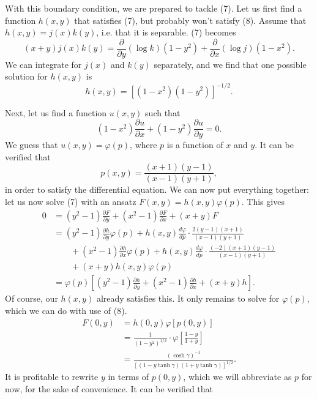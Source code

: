 \documentclass[12pt]{article}
\begin{document}
With this boundary condition, we are prepared to tackle (7).  Let us first find a function $h(x,y)$ that satisfies (7), but probably won't satisfy (8).  Assume that $h(x,y)=j(x)k(y)$, i.e. that it is separable.  (7) becomes
\[
	(x+y) j(x) k(y) = \frac{\partial }{\partial y}(\log k)(1-y^{2}) + \frac{\partial }{\partial x}(\log j)(1-x^2).
\] 
We can integrate for $j(x)$ and $k(y)$ separately, and we find that one possible solution for $h(x,y)$ is
\begin{equation}
	h(x,y) = \left[ (1-x^2) (1-y^2) \right] ^{-1/2}.
\end{equation}

Next, let us find a function $u(x,y)$ such that
\[
	(1-x^2)\frac{\partial u}{\partial x} + (1-y^2)\frac{\partial u}{\partial y} = 0.
\] 
We guess that $u(x,y) = \varphi(p)$, where $p$ is a function of $x$ and $y$.  It can be verified that 
\begin{equation}
	p (x,y) = \frac{(x+1)(y-1)}{(x-1)(y+1)},
\end{equation}
in order to satisfy the differential equation.  We can now put everything together: let us now solve (7) with an ansatz $F(x,y) = h(x,y) \varphi(p)$.  This gives
\begin{align*}
	0 &= (y^2 - 1)\frac{\partial F}{\partial y} + (x^2 - 1)\frac{\partial F}{\partial x} + (x+ y) F \\
	  &= (y^2 - 1)\frac{\partial h}{\partial y}\varphi(p) + h(x,y) \frac{\textit{d}\varphi}{\textit{d}p} \cdot \frac{2(y-1)(x+1)}{(x-1)(y+1)} \\
	  &   \qquad  + (x^2 - 1)\frac{\partial h}{\partial x}\varphi(p) + h(x,y) \frac{\textit{d}\varphi}{\textit{d}p} \cdot \frac{(-2)(x+1)(y-1)}{(x-1)(y+1)} \\
	  & \qquad + (x+y)h(x,y)\varphi(p)  \\
	  &= \varphi(p)\left[ (y^2 -1 )\frac{\partial h}{\partial y} + (x^2 - 1)\frac{\partial h}{\partial x} + (x+y) h \right] .
\end{align*}
Of course, our $h(x,y)$ already satisfies this.  It only remains to solve for $\varphi(p)$, which we can do with use of (8).  
\begin{align*}
	F(0,y) &= h(0,y) \varphi[p(0,y)] \\
	       &= \frac{1}{(1-y^2)^{1/2}} \cdot \varphi \left[ \frac{1-y}{1+y} \right] \\
	       &= \frac{(\cosh \gamma)^{-1}}{\left[ (1-y\tanh \gamma)(1+y\tanh \gamma) \right] ^{1/2}}.
\end{align*}
It is profitable to rewrite $y$ in terms of $p(0,y)$, which we will abbreviate as $p$ for now, for the sake of convenience.  It can be verified that
\end{document}
